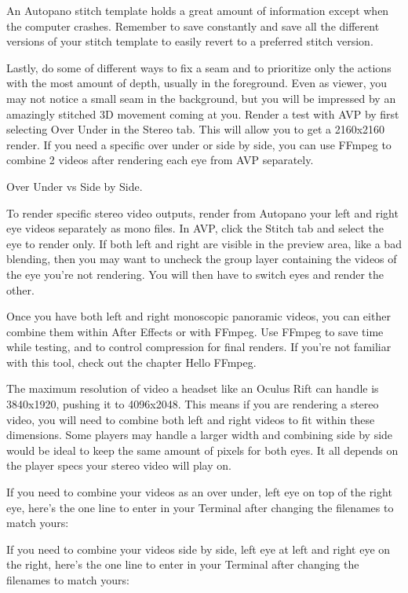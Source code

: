 \begin{fullwidth}
An Autopano stitch template holds a great amount of information except when the computer crashes.  Remember to save constantly and save all the different versions of your stitch template to easily revert to a preferred stitch version. 
\clearpage


Lastly, do some \textbf{} of different ways to fix a seam and to prioritize only the actions with the most amount of depth, usually in the foreground. Even as viewer, you may not notice a small seam in the background, but you will be impressed by an amazingly stitched 3D movement coming at you. Render a test with AVP by first selecting Over Under in the Stereo tab. This will allow you to get a 2160x2160 render. If you need a specific over under or side by side, you can use FFmpeg to combine 2 videos after rendering each eye from AVP separately.

\clearpage
{\large Over Under vs Side by Side. \par}

To render specific stereo video outputs, render from Autopano your left and right eye videos separately as mono files. In AVP, click the Stitch tab and select the eye to render only. If both left and right are visible in the preview area, like a bad blending, then you may want to uncheck the group layer containing the videos of the eye you’re not rendering. You will then have to switch eyes and render the other.

Once you have both left and right monoscopic panoramic videos, you can either combine them within After Effects or with FFmpeg. Use FFmpeg to save time while testing, and to control compression for final renders. If you’re not familiar with this tool, check out the chapter Hello FFmpeg. 

The maximum resolution of video a headset like an Oculus Rift can handle is 3840x1920, pushing it to 4096x2048. This means if you are rendering a stereo video, you will need to combine both left and right videos to fit within these dimensions. Some players may handle a larger width and combining side by side would be ideal to keep the same amount of pixels for both eyes. It all depends on the player specs your stereo video will play on. 

If you need to combine your videos as an over under, left eye on top of the right eye, here’s the one line to enter in your Terminal after changing the filenames to match yours:


If you need to combine your videos side by side, left eye at left and right eye on the right, here’s the one line to enter in your Terminal after changing the filenames to match yours:




\clearpage
\end{fullwidth}

